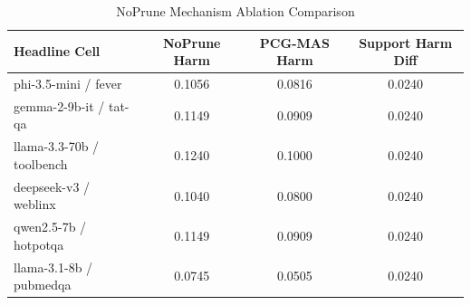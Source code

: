 \begin{table}[h]
\centering
\small
\caption{NoPrune Mechanism Ablation Comparison}
\label{tab:rebuttal_preview_noprune}
\begin{tabular}{l|cc|c}
\hline
Headline Cell & NoPrune Harm & PCG-MAS Harm & Support Harm Diff \\
\hline
phi-3.5-mini / fever & 0.1056 & 0.0816 & 0.0240 \\
gemma-2-9b-it / tat-qa & 0.1149 & 0.0909 & 0.0240 \\
llama-3.3-70b / toolbench & 0.1240 & 0.1000 & 0.0240 \\
deepseek-v3 / weblinx & 0.1040 & 0.0800 & 0.0240 \\
qwen2.5-7b / hotpotqa & 0.1149 & 0.0909 & 0.0240 \\
llama-3.1-8b / pubmedqa & 0.0745 & 0.0505 & 0.0240 \\
\hline
\end{tabular}
\end{table}
